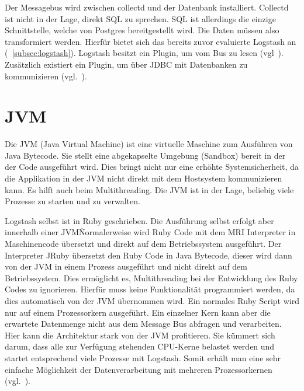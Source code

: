 Der Messagebus wird zwischen collectd und der Datenbank installiert. Collectd
ist nicht in der Lage, direkt \gls{SQL} zu sprechen. \gls{SQL} ist allerdings
die einzige Schnittstelle, welche von Postgres bereitgestellt wird. Die
Daten müssen also transformiert werden. Hierfür bietet sich das bereits zuvor
evaluierte Logstash an (~\ref{subsec:logstash}). Logstash besitzt ein Plugin,
um vom Bus zu lesen (vgl~\cite{logstash-rabbitmq}). Zusätzlich existiert ein
Plugin, um über \gls{JDBC} mit Datenbanken zu kommunizieren
(vgl.~\cite{logstash-jdbc}).
\tm%

\section{JVM}
Die \gls{JVM} (Java Virtual Machine) ist eine virtuelle Maschine zum Ausführen
von Java Bytecode. Sie stellt eine abgekapselte Umgebung (Sandbox) bereit in
der der Code ausgeführt wird. Dies bringt nicht nur eine erhöhte
Systemsicherheit, da die Applikation in der \gls{JVM} nicht direkt mit dem
Hostsystem kommunizieren kann. Es hilft auch beim Multithreading. Die \gls{JVM}
ist in der Lage, beliebig viele Prozesse zu starten und zu verwalten.

Logstash selbst ist in Ruby geschrieben. Die Ausführung selbst erfolgt aber
innerhalb einer \gls{JVM}\. Normalerweise wird Ruby Code mit dem \gls{MRI}
Interpreter in Maschinencode übersetzt und direkt auf dem Betriebssystem
ausgeführt. Der Interpreter JRuby übersetzt den Ruby Code in Java Bytecode,
dieser wird dann von der \gls{JVM} in einem Prozess ausgeführt und nicht
direkt auf dem Betriebssystem. Dies ermöglicht es, Multithreading bei der
Entwicklung des Ruby Codes zu ignorieren. Hierfür muss keine Funktionalität
programmiert werden, da dies automatisch von der \gls{JVM} übernommen wird. Ein
normales Ruby Script wird nur auf einem Prozessorkern ausgeführt. Ein einzelner
Kern kann aber die erwartete Datenmenge nicht aus dem Message Bus abfragen und
verarbeiten. Hier kann die Architektur stark von der \gls{JVM} profitieren. Sie
kümmert sich darum, dass alle zur Verfügung stehenden CPU\hyp{}Kerne belastet
werden und startet entsprechend viele Prozesse mit Logstash. Somit erhält man
eine sehr einfache Möglichkeit der Datenverarbeitung mit mehreren
Prozessorkernen (vgl.~\cite{jruby}).
\tm%

